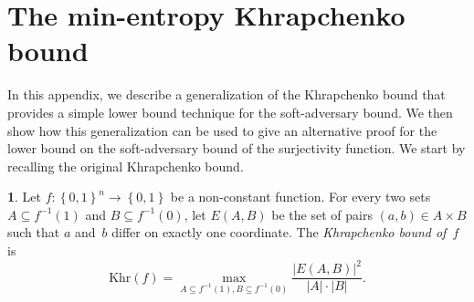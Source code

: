 \documentclass[11pt]{article}
\makeatletter
\numberwithin{equation}{section}
\theoremstyle{definition}
\theoremstyle{plain}
\newcommand{\expref}[2]{\hyperref[#2]{#1~\ref{#2}}}
\theoremstyle{definition}\newtheorem{notation}[theorem]{Notation}\theoremstyle{plain}
\newcommand{\B}{\left\{ 0,1 \right \}}
\newcommand{\K}{\mathrm{Khr}}
\theoremstyle{definition}
\newtheorem*{rep@definition}{\rep@ref}
\newenvironment{repdefinition}[1]{
 \def\rep@ref{#1}
 \begin{rep@definition}}
 {\end{rep@definition}}
\theoremstyle{plain}
\makeatother
\begin{document}
\section{\label{sec:min-khrapchenko}The min-entropy Khrapchenko bound}

In this appendix, we describe a generalization of the Khrapchenko
bound that provides a simple %
lower bound technique for %
the soft-adversary
bound. We then show how this generalization can be used to give an
alternative proof for the lower bound on the soft-adversary bound
of the surjectivity function. We start by recalling the original Khrapchenko
bound.
\begin{repdefinition}{\expref{Definition}{def:khrapchenko}}
Let $f\colon\B^{n}\to\B$ be a non-constant function. For every two
sets $A\subseteq f^{-1}(1)$ and $B\subseteq f^{-1}(0)$, let $E(A,B)$
be the set of pairs $(a,b)\in A\times B$ such that $a$ and~$b$
differ on exactly one coordinate. The \emph{Khrapchenko bound of~$f$}
is 
\[
\K(f)=\max_{A\subseteq f^{-1}(1),B\subseteq f^{-1}(0)}\frac{\left|E(A,B)\right|^{2}}{\left|A\right|\cdot\left|B\right|}.
\]
\end{repdefinition}
\end{document}
